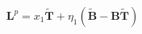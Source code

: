\documentclass[preview]{standalone}
\begin{document}
\begin{align*}
\quad \mathbf{L}^p = x_1 \tilde{\mathbf{T}} + \eta_1 (\tilde{\mathbf{B}} - \mathbf{B} \tilde{\mathbf{T}})
\end{align*}
\end{document}
